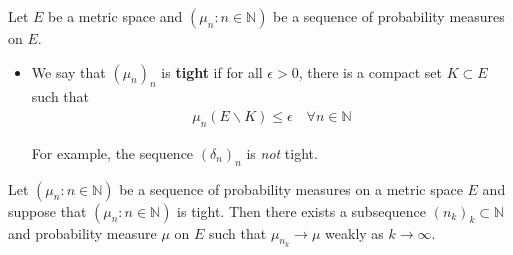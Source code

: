 \documentclass[10pt,a4paper]{report}
\begin{document}
Let $E$ be a metric space and $(\mu_n : n\in \mathbb{N})$ be a sequence of probability measures on $E$.
\begin{itemize}
\item We say that $(\mu_n)_n$ is \textbf{tight} if for all $\epsilon >0$, there is a compact set $K \subset E$ such that
\begin{align*}
\mu_n (E \backslash K) \leq \epsilon \quad \forall n\in \mathbb{N}
\end{align*}
\s

For example, the sequence $(\delta_n)_n$ is \emph{not} tight.
\end{itemize}
\s

 Let $(\mu_n : n\in \mathbb{N})$ be a sequence of probability measures on a metric space $E$ and suppose that $(\mu_n : n\in \mathbb{N})$ is tight. Then there exists a subsequence $(n_k)_k \subset \mathbb{N}$ and probability measure $\mu$ on $E$ such that $\mu_{n_k} \rightarrow \mu$ weakly as $k\rightarrow \infty$.
\s
\end{document}
